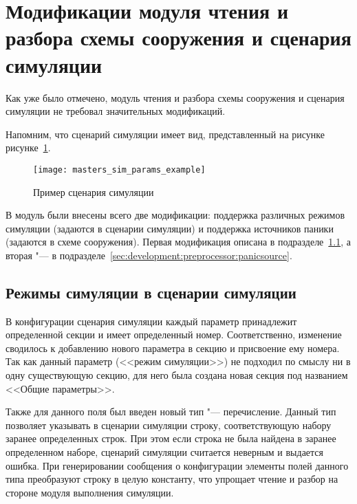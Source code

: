 \section{Модификации модуля чтения и разбора схемы сооружения и сценария симуляции}
\label{sec:development:preprocessor}

Как уже было отмечено, модуль чтения и разбора схемы сооружения и сценария симуляции не требовал значительных модификаций.

Напомним, что сценарий симуляции имеет вид, представленный на рисунке рисунке~\ref{sec:development:preprocessor:scenario_dsl_listing}.

\begin{figure}[ht!]
  \centering
  \texttt{[image: masters\_sim\_params\_example]}
  \caption{Пример сценария симуляции}
  \label{sec:development:preprocessor:scenario_dsl_listing}
\end{figure}

В модуль были внесены всего две модификации: поддержка различных режимов симуляции (задаются в сценарии симуляции) и поддержка источников паники (задаются в схеме сооружения).
Первая модификация описана в подразделе~\ref{sec:development:preprocessor:escape}, а вторая "--- в подразделе~\ref{sec:development:preprocessor:panicsource}.

\subsection{Режимы симуляции в сценарии симуляции}
\label{sec:development:preprocessor:escape}

В конфигурации сценария симуляции каждый параметр принадлежит определенной секции и имеет определенный номер.
Соответственно, изменение сводилось к добавлению нового параметра в секцию и присвоение ему номера.
Так как данный параметр (<<режим симуляции>>) не подходил по смыслу ни в одну существующую секцию,
для него была создана новая секция под названием <<Общие параметры>>.

Также для данного поля был введен новый тип "--- перечисление.
Данный тип позволяет указывать в сценарии симуляции строку, соответствующую набору заранее определенных строк.
При этом если строка не была найдена в заранее определенном наборе, сценарий симуляции считается неверным и выдается ошибка.
При генерировании сообщения о конфигурации элементы полей данного типа преобразуют строку в целую константу, что упрощает чтение и разбор на стороне модуля выполнения симуляции.

